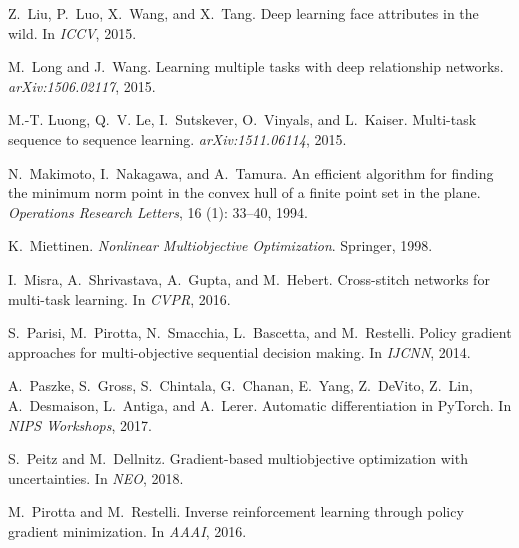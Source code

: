 \documentclass{article}
\begin{document}
{\begin{thebibliography}{60}
Z.~Liu, P.~Luo, X.~Wang, and X.~Tang.
\newblock Deep learning face attributes in the wild.
\newblock In \emph{{ICCV}}, 2015{}.

M.~Long and J.~Wang.
\newblock Learning multiple tasks with deep relationship networks.
\newblock \emph{arXiv:1506.02117}, 2015.

M.-T. Luong, Q.~V. Le, I.~Sutskever, O.~Vinyals, and L.~Kaiser.
\newblock Multi-task sequence to sequence learning.
\newblock \emph{arXiv:1511.06114}, 2015.

N.~Makimoto, I.~Nakagawa, and A.~Tamura.
\newblock An efficient algorithm for finding the minimum norm point in the
  convex hull of a finite point set in the plane.
\newblock \emph{Operations Research Letters}, 16 (1): 33--40,
  1994.

K.~Miettinen.
\newblock \emph{Nonlinear Multiobjective Optimization}.
\newblock Springer, 1998.

I.~Misra, A.~Shrivastava, A.~Gupta, and M.~Hebert.
\newblock Cross-stitch networks for multi-task learning.
\newblock In \emph{CVPR}, 2016.

S.~Parisi, M.~Pirotta, N.~Smacchia, L.~Bascetta, and M.~Restelli.
\newblock Policy gradient approaches for multi-objective sequential decision
  making.
\newblock In \emph{IJCNN}, 2014.

A.~Paszke, S.~Gross, S.~Chintala, G.~Chanan, E.~Yang, Z.~DeVito, Z.~Lin,
  A.~Desmaison, L.~Antiga, and A.~Lerer.
\newblock Automatic differentiation in {PyTorch}.
\newblock In \emph{NIPS Workshops}, 2017.

S.~Peitz and M.~Dellnitz.
\newblock Gradient-based multiobjective optimization with uncertainties.
\newblock In \emph{NEO}, 2018.

M.~Pirotta and M.~Restelli.
\newblock Inverse reinforcement learning through policy gradient minimization.
\newblock In \emph{AAAI}, 2016.


\end{thebibliography}}
\end{document}

